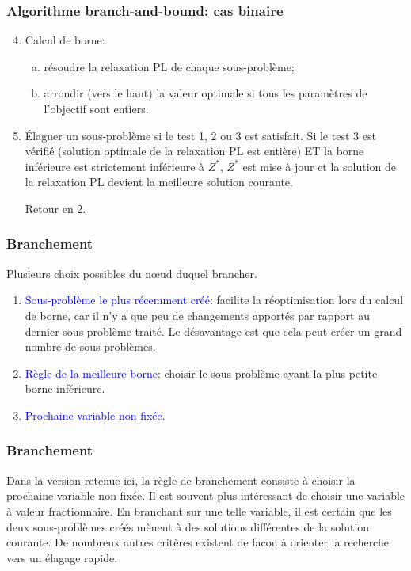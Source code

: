 \documentclass[usepdftitle=false, aspectratio=169]{beamer}
\begin{document}
\begin{frame}
\frametitle{Algorithme branch-and-bound: cas binaire}

\begin{enumerate}
\setcounter{enumi}{3}
\item
Calcul de borne:
\begin{enumerate}[(a)]
	\item
	résoudre la relaxation PL de chaque sous-problème;
	\item
	arrondir (vers le haut) la valeur optimale si tous les paramètres de l'objectif sont entiers.
\end{enumerate}
\item
Élaguer un sous-problème si le test 1, 2 ou 3 est satisfait. Si le test 3 est vérifié (solution optimale de la relaxation PL est entière) ET la borne inférieure est strictement inférieure à $Z^*$, $Z^*$ est mise à jour et la solution de la relaxation PL devient la meilleure solution courante.

Retour en 2.
\end{enumerate}

\end{frame}

\begin{frame}
\frametitle{Branchement}

Plusieurs choix possibles du n\oe{}ud duquel brancher.

\mbox{}

\begin{enumerate}
	\item 
\textcolor{blue}{Sous-problème le plus récemment créé}: facilite la réoptimisation lors du calcul de borne, car il n'y a que peu de changements apportés par rapport au dernier sous-problème traité.
Le désavantage est que cela peut créer un grand nombre de sous-problèmes.
	\item 
\textcolor{blue}{Règle de la meilleure borne}: choisir le sous-problème ayant la plus petite borne inférieure.
	\item 
\textcolor{blue}{Prochaine variable non fixée}.
\end{enumerate}

\end{frame}

\begin{frame}
\frametitle{Branchement}

Dans la version retenue ici, la règle de branchement consiste à choisir la prochaine variable non fixée. Il est souvent plus intéressant de choisir une variable à valeur fractionnaire.
En branchant sur une telle variable, il est certain que les deux sous-problèmes créés mènent à des solutions différentes de la solution courante.
De nombreux autres critères existent de facon à orienter la recherche vers un élagage rapide.

\end{frame}
\end{document}

